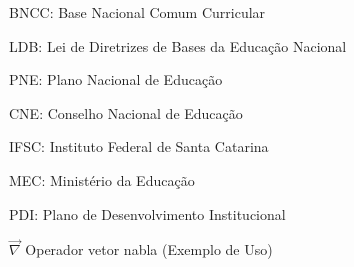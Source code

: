 \listoffigures*
\newpage

\listofquadros*
\cleardoublepage


\listoftables*
\newpage


\begin{siglas}
	\item BNCC:	Base Nacional Comum Curricular
	\item LDB:	Lei de Diretrizes de Bases da Educação Nacional
	\item PNE:	Plano Nacional de Educação
	\item CNE:	Conselho Nacional de Educação
    \item IFSC:	Instituto Federal de Santa Catarina
    \item MEC:	Ministério da Educação
    \item PDI:	Plano de Desenvolvimento Institucional
\end{siglas}
\newpage

\begin{simbolos}
    \item[$ \vec{\nabla} $] Operador vetor nabla (Exemplo de Uso)
    
\end{simbolos}